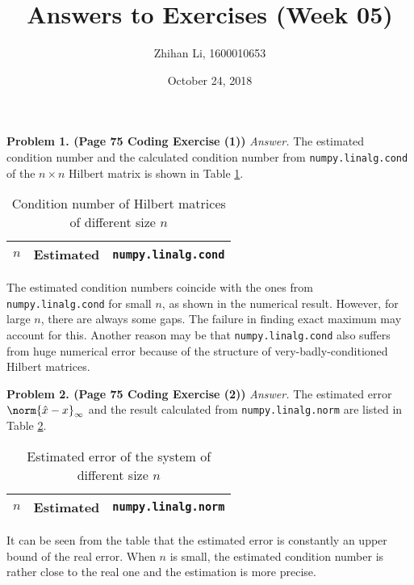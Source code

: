 \documentclass[english, nochinese]{pnote}
\title{Answers to Exercises (Week 05)}
\author{Zhihan Li, 1600010653}
\date{October 24, 2018}
\begin{document}
\maketitle

\textbf{Problem 1. (Page 75 Coding Exercise (1))} \textit{Answer.} The estimated condition number and the calculated condition number from \verb"numpy.linalg.cond" of the $ n \times n $ Hilbert matrix is shown in Table \ref{Tbl:Hilbert}.

\begin{table}[htb]
\centering
\begin{tabular}{|c|c|c|}
\hline
$n$ & Estimated & \verb"numpy.linalg.cond" \\
\hline

\end{tabular}
\caption{Condition number of Hilbert matrices of different size $n$}
\label{Tbl:Hilbert}
\end{table}

The estimated condition numbers coincide with the ones from \verb"numpy.linalg.cond" for small $n$, as shown in the numerical result. However, for large $n$, there are always some gaps. The failure in finding exact maximum may account for this. Another reason may be that \verb"numpy.linalg.cond" also suffers from huge numerical error because of the structure of very-badly-conditioned Hilbert matrices.

\textbf{Problem 2. (Page 75 Coding Exercise (2))} \textit{Answer.} The estimated error $ \norm{ \hat{x} - x }_{\infty} $ and the result calculated from \verb"numpy.linalg.norm" are listed in Table \ref{Tbl:Err}.

\begin{table}[htb]
\centering
\begin{tabular}{|c|c|c|}
\hline
$n$ & Estimated & \verb"numpy.linalg.norm" \\
\hline

\end{tabular}
\caption{Estimated error of the system of different size $n$}
\label{Tbl:Err}
\end{table}

It can be seen from the table that the estimated error is constantly an upper bound of the real error. When $n$ is small, the estimated condition number is rather close to the real one and the estimation is more precise.
\end{document}
